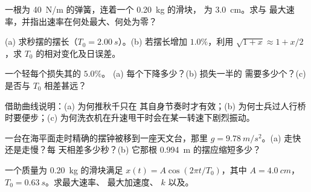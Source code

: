 \begin{exercise}[$\star\star$]\label{exo:g12:oscillators-and-time:8}
一根为 \qty{40}{N/m} 的弹簧，连着一个 \qty{0.20}{kg} 的滑块，
为 \qty{3.0}{cm}。求与
最大速率，并指出速率在何处最大、何处为零？
\end{exercise}

\begin{exercise}[$\star\star$]\label{exo:g12:oscillators-and-time:9}
(a) 求秒摆的摆长（$T_0 =
\qty{2.00}{s}$）。(b) 若摆长增加 $1.0\%$，利用 $\sqrt{1+x}
\approx 1 + x/2$，求 $T_0$ 的相对变化及日误差。
\end{exercise}

\begin{exercise}[$\star\star$]\label{exo:g12:oscillators-and-time:10}
一个轻每个损失其的 $5.0\%$。
(a) 每个下降多少？(b) 损失一半的
需要多少个？(c) 是否与 $T_0$ 相差甚远？
\end{exercise}

\begin{exercise}[$\star\star$]\label{exo:g12:oscillators-and-time:11}
借助曲线说明：(a) 为何推秋千只在
其自身节奏时才有效；(b) 为何士兵过人行桥时要便步；(c)
为何洗衣机在升速甩干时会在某一转速下剧烈振动。
\end{exercise}

\begin{exercise}[$\star\star\star$]\label{exo:g12:oscillators-and-time:12}
一台在海平面走时精确的摆钟被移到一座天文台，那里
$g = \qty{9.78}{m/s^2}$。(a) 走快还是走慢？每
天相差多少秒？(b) 它那根 \qty{0.994}{m} 的摆应缩短多少？
\end{exercise}

\begin{exercise}[$\star\star\star$]\label{exo:g12:oscillators-and-time:13}
一个质量为 \qty{0.20}{kg} 的滑块满足 $x(t) = A\cos(2\pi t/T_0)$，其中 $A =
\qty{4.0}{cm}$，$T_0 = \qty{0.63}{s}$。求最大速率、
最大加速度、 $k$ 以及。
\end{exercise}

